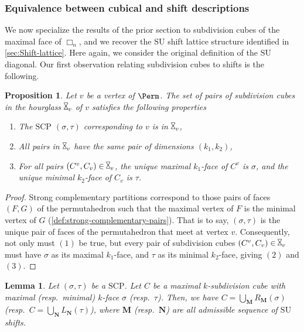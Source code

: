 \documentclass{amsart}
\newtheorem{proposition}[theorem]{Proposition}
\newtheorem{lemma}[theorem]{Lemma}
\theoremstyle{definition}
\newcommand{\resp}{resp.~} %
\newcommand{\SU}{\mathrm{SU}}
\newcommand{\SCP}{\mathrm{SCP}}
\newcommand{\divcube}[1]{\Box_{#1}}
\newcommand{\hour}{\raisebox{0.065cm}{\rotatebox[origin=c]{90}{$\bowtie$}}_v}
\begin{document}
\subsubsection{Equivalence between cubical and shift descriptions}

We now specialize the results of the prior section to subdivision cubes of the maximal face of $\divcube{n}$, and we recover the $\SU$ shift lattice structure identified in \cref{sec:Shift-lattice}.
Here again, we consider the original definition of the $\SU$ diagonal.
Our first observation relating subdivision cubes to shifts is the following. 

\begin{proposition}
\label{prop:ev properties}
Let $v$ be a vertex of $\Perm$.
The set of pairs of subdivision cubes in the hourglass $\hour$ of $v$ satisfies the following properties
\begin{enumerate}
	\item The $\SCP$ $(\sigma,\tau)$ corresponding to $v$ is in $\hour$,
	\item All pairs in $\hour$ have the same pair of dimensions $(k_1,k_2)$,
	\item For all pairs $(C^v,C_v) \in \hour$, the unique maximal $k_1$-face of $C^v$ is $\sigma$, and the unique minimal $k_2$-face of $C_v$ is $\tau$.
\end{enumerate}
\end{proposition}

\begin{proof}
Strong complementary partitions correspond to those pairs of faces $(F,G)$ of the permutahedron such that the maximal vertex of $F$ is the minimal vertex of $G$ (\cref{def:strong-complementary-pairs}).
That is to say, $(\sigma,\tau)$ is the unique pair of faces of the permutahedron that meet at vertex $v$.
Consequently, not only must $(1)$ be true, but every pair of subdivision cubes $(C^v,C_v) \in \hour$ must have $\sigma$ as its maximal $k_1$-face, and $\tau$ as its minimal $k_2$-face, giving $(2)$ and $(3)$.
\end{proof}

\begin{lemma}
Let $(\sigma,\tau)$ be a $\SCP$. 
Let $C$ be a maximal $k$-subdivision cube with maximal (\resp minimal) $k$-face $\sigma$ (\resp $\tau$).
Then, we have $C = \bigcup_{\mathbf{M}} R_\mathbf{M}(\sigma)$ (\resp ${C=\bigcup_{\mathbf{N}} L_\mathbf{N}(\tau)}$), where $\mathbf{M}$ (\resp $\mathbf{N}$) are all admissible sequence of $\SU$ shifts.
\end{lemma}
\end{document}
